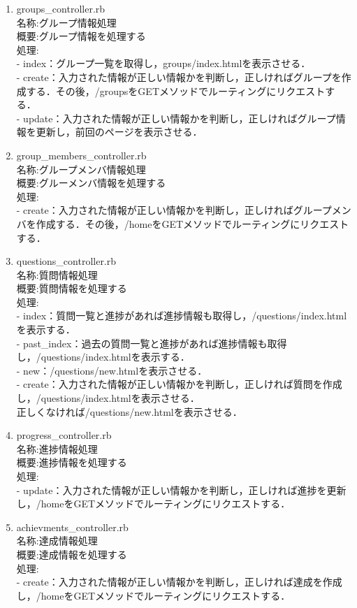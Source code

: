 \begin{enumerate}
  \item  groups\_controller.rb\\
名称:グループ情報処理\\
概要:グループ情報を処理する\\
処理:\\
- index：グループ一覧を取得し，groups/index.htmlを表示させる．\\
- create：入力された情報が正しい情報かを判断し，正しければグループを作成する．その後，/groupsをGETメソッドでルーティングにリクエストする．\\
- update：入力された情報が正しい情報かを判断し，正しければグループ情報を更新し，前回のページを表示させる．

  \item  group\_members\_controller.rb\\
名称:グループメンバ情報処理\\
概要:グルーメンバ情報を処理する\\
処理:\\
- create：入力された情報が正しい情報かを判断し，正しければグループメンバを作成する．その後，/homeをGETメソッドでルーティングにリクエストする．

  \item  questions\_controller.rb\\
名称:質問情報処理\\
概要:質問情報を処理する\\
処理:\\
- index：質問一覧と進捗があれば進捗情報も取得し，/questions/index.htmlを表示する．\\
- past\_index：過去の質問一覧と進捗があれば進捗情報も取得し，/questions/index.htmlを表示する．\\
- new：/questions/new.htmlを表示させる．\\
- create：入力された情報が正しい情報かを判断し，正しければ質問を作成し，/questions/index.htmlを表示させる．\\
          正しくなければ/questions/new.htmlを表示させる．

  \item  progress\_controller.rb\\
名称:進捗情報処理\\
概要:進捗情報を処理する\\
処理:\\
- update：入力された情報が正しい情報かを判断し，正しければ進捗を更新し，/homeをGETメソッドでルーティングにリクエストする．

  \item  achievments\_controller.rb\\
名称:達成情報処理\\
概要:達成情報を処理する\\
処理:\\
- create：入力された情報が正しい情報かを判断し，正しければ達成を作成し，/homeをGETメソッドでルーティングにリクエストする．


\end{enumerate}
